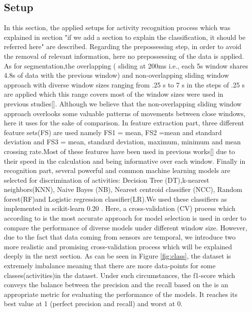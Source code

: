 \subsection{Setup}
In this section, the applied setups for activity recognition process which was explained in section {"if we add a section to explain the classification, it should be referred here"} are described. Regarding the prepossessing step, in order to avoid the removal of relevant information, here no prepossessing of the data is applied. As for segmentation,the overlapping (  sliding at 200ms i.e., each 5s window
shares 4.8s of data with the previous window) \cite{morris2014recofit} and non-overlapping \cite{banos2014window} sliding window approach with diverse window sizes ranging from .25 s to 7 s in the steps of .25 s are applied which this range covers most of the window sizes were used in previous studies[]. Although we believe that the non-overlapping sliding window approach overlooks some valuable patterns of movements between close windows, here it uses for the sake of comparison. 
In feature extraction part, three different feature sets(FS) are used namely FS1 = {mean}, FS2 ={mean and standard deviation} and FS3 = {mean, standard deviation, maximum, minimum and mean crossing rate}.Most of these features have been used in previous works[] due to their speed in the calculation and being informative over each window. Finally in recognition part, several powerful and common machine learning models are selected for discrimination of activities: Decision Tree (DT),k-nearest neighbors(KNN), Naive Bayes (NB), Nearest centroid classifier (NCC), Random forest(RF)and Logistic regression classifier(LR).We used these classifiers as implemented in scikit-learn 0.20 \cite{pedregosa2011scikit}.\newline
Here, a cross-validation (CV) process which according to \cite{arlot2010survey} is the most accurate approach for model selection is used in order to compare the performance of diverse models under different window size. However, due to the fact that data coming from sensors are temporal, we introduce two more realistic and promising cross-validation process which will be explained deeply in the next section.\newline
As can be seen in Figure \ref{fig:class}, the dataset is extremely imbalance meaning that there are more data-points for some classes(activities)in the dataset. Under such circumstances, the f1-score which conveys the balance between the precision and the recall based on the {} is an appropriate metric for evaluating the performance of the models. It reaches its best value at 1 (perfect precision and recall) and worst at 0.

